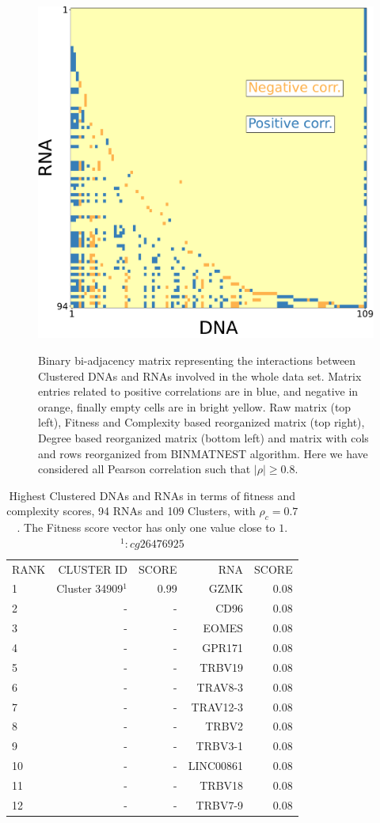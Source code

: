 \documentclass[10pt,a4paper]{article}
\begin{document}
\begin{figure}[h!]
\begin{center}
{\includegraphics[width=0.5\columnwidth]{FIG/ADN_c-ARN_BINMATNEST-Matrix-unit-0.8.pdf}
}
\end{center}
\caption{\label{fig:fig1}Binary bi-adjacency matrix representing the interactions between Clustered DNAs and RNAs involved in the whole data set. Matrix entries related to positive correlations are in blue, and negative in orange, finally empty cells are in bright yellow. Raw matrix (top left), Fitness and Complexity based reorganized matrix (top right), Degree based reorganized matrix (bottom left) and matrix with cols and rows reorganized from BINMATNEST algorithm. Here we have considered all Pearson correlation such that $|\rho| \geq 0.8$.}
\end{figure}
 \begin{table}[h!]
\centering
\caption{\label{tab:tab1} Highest Clustered DNAs and RNAs in terms of fitness and complexity scores, 94 RNAs and 109 Clusters, with $\rho_{c} = 0.7$. The Fitness score vector has only one value close to $1$. $^{1} : cg26476925$}
\begin{tabular}{l|rr|rr|}
\cline{1-5}
RANK & CLUSTER ID & SCORE & RNA & SCORE\\
\cline{1-5}
1 & Cluster 34909$^{1}$ & 0.99 & GZMK & 0.08\\
2 & - & - & CD96 & 0.08\\
3 & - & - & EOMES & 0.08\\
4 & - & - & GPR171 & 0.08\\
5 & - & - & TRBV19 & 0.08\\
6 & - & - & TRAV8-3 & 0.08\\
7 & - & - & TRAV12-3 & 0.08\\
8 & - & - & TRBV2 & 0.08\\
9 & - & - & TRBV3-1 & 0.08\\
10 & - & - & LINC00861 & 0.08\\
11 & - & - & TRBV18 & 0.08\\
12 & - & - & TRBV7-9 & 0.08\\
\cline{1-5}
\end{tabular}
\end{table}
\end{document}
